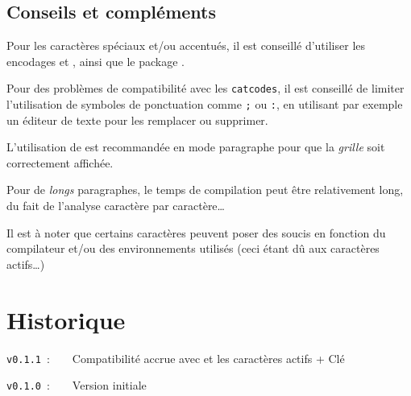 \documentclass[french,11pt,a4paper]{article}
\begin{document}
\begin{DemoCode}[]
\end{DemoCode}

\begin{DemoCode}[]
\end{DemoCode}

\begin{DemoCode}[]
\end{DemoCode}

\begin{DemoCode}[]
\end{DemoCode}

\begin{DemoCode}[]
\end{DemoCode}

\subsection{Conseils et compléments}

Pour les caractères spéciaux et/ou accentués, il est conseillé d'utiliser les encodages  et , ainsi que le package .

\smallskip

Pour des problèmes de compatibilité avec les \texttt{catcodes}, il est conseillé de limiter l'utilisation de symboles de ponctuation comme \texttt{;} ou \texttt{:}, en utilisant par exemple un éditeur de texte pour les remplacer ou supprimer.

\smallskip

L'utilisation de  est recommandée en mode paragraphe pour que la \textit{grille} soit correctement affichée.

\smallskip

Pour de \textit{longs} paragraphes, le temps de compilation peut être relativement long, du fait de l'analyse caractère par caractère\ldots

\smallskip

Il est à noter que certains caractères peuvent poser des soucis en fonction du compilateur et/ou des environnements utilisés (ceci étant dû aux caractères actifs\ldots)

\pagebreak

\section{Historique}

\verb|v0.1.1|~:~~~~Compatibilité accrue avec  et les caractères actifs + Clé \MontreCode{[Color]}

\verb|v0.1.0|~:~~~~Version initiale
\end{document}

